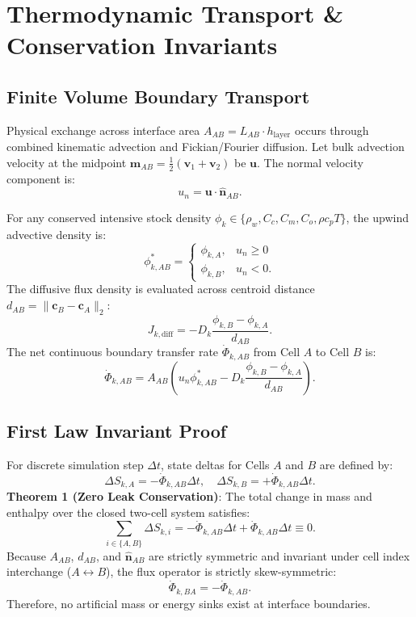 \documentclass[10pt,journal,compsoc]{IEEEtran}
\begin{document}
\section{Thermodynamic Transport \& Conservation Invariants}

\subsection{Finite Volume Boundary Transport}
Physical exchange across interface area $A_{AB} = L_{AB} \cdot h_{\text{layer}}$ occurs through combined kinematic advection and Fickian/Fourier diffusion.
Let bulk advection velocity at the midpoint $\mathbf{m}_{AB} = \frac{1}{2}(\mathbf{v}_1 + \mathbf{v}_2)$ be $\mathbf{u}$. The normal velocity component is:
\begin{equation}
u_n = \mathbf{u} \cdot \hat{\mathbf{n}}_{AB}.
\end{equation}

For any conserved intensive stock density $\phi_k \in \{ \rho_w, C_c, C_m, C_o, \rho c_p T \}$, the upwind advective density is:
\begin{equation}
\phi^*_{k, AB} = \begin{cases}
\phi_{k, A}, & u_n \ge 0 \\
\phi_{k, B}, & u_n < 0.
\end{cases}
\end{equation}
The diffusive flux density is evaluated across centroid distance $d_{AB} = \|\mathbf{c}_B - \mathbf{c}_A\|_2$:
\begin{equation}
J_{k, \text{diff}} = -D_k \frac{\phi_{k, B} - \phi_{k, A}}{d_{AB}}.
\end{equation}
The net continuous boundary transfer rate $\dot{\Phi}_{k, AB}$ from Cell $A$ to Cell $B$ is:
\begin{equation}
\dot{\Phi}_{k, AB} = A_{AB} \left( u_n \phi^*_{k, AB} - D_k \frac{\phi_{k, B} - \phi_{k, A}}{d_{AB}} \right).
\end{equation}

\subsection{First Law Invariant Proof}
For discrete simulation step $\Delta t$, state deltas for Cells $A$ and $B$ are defined by:
\begin{equation}
\Delta S_{k, A} = -\dot{\Phi}_{k, AB} \Delta t, \quad \Delta S_{k, B} = +\dot{\Phi}_{k, AB} \Delta t.
\end{equation}
\textbf{Theorem 1 (Zero Leak Conservation)}: The total change in mass and enthalpy over the closed two-cell system satisfies:
\begin{equation}
\sum_{i \in \{A, B\}} \Delta S_{k, i} = -\dot{\Phi}_{k, AB} \Delta t + \dot{\Phi}_{k, AB} \Delta t \equiv 0.
\end{equation}
Because $A_{AB}$, $d_{AB}$, and $\hat{\mathbf{n}}_{AB}$ are strictly symmetric and invariant under cell index interchange ($A \leftrightarrow B$), the flux operator is strictly skew-symmetric:
\begin{equation}
\dot{\Phi}_{k, BA} = -\dot{\Phi}_{k, AB}.
\end{equation}
Therefore, no artificial mass or energy sinks exist at interface boundaries.
\end{document}
